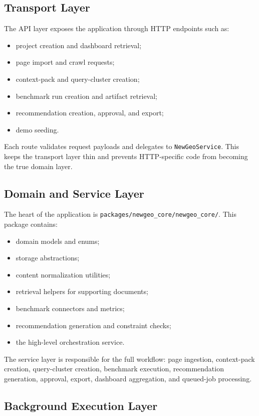 \subsection{Transport Layer}

The API layer exposes the application through HTTP endpoints such as:
\begin{itemize}
    \item project creation and dashboard retrieval;
    \item page import and crawl requests;
    \item context-pack and query-cluster creation;
    \item benchmark run creation and artifact retrieval;
    \item recommendation creation, approval, and export;
    \item demo seeding.
\end{itemize}

Each route validates request payloads and delegates to \texttt{NewGeoService}. This keeps the
transport layer thin and prevents HTTP-specific code from becoming the true domain layer.

\subsection{Domain and Service Layer}

The heart of the application is \texttt{packages/newgeo\_core/newgeo\_core/}. This package
contains:
\begin{itemize}
    \item domain models and enums;
    \item storage abstractions;
    \item content normalization utilities;
    \item retrieval helpers for supporting documents;
    \item benchmark connectors and metrics;
    \item recommendation generation and constraint checks;
    \item the high-level orchestration service.
\end{itemize}

The service layer is responsible for the full workflow: page ingestion, context-pack creation,
query-cluster creation, benchmark execution, recommendation generation, approval, export,
dashboard aggregation, and queued-job processing.

\subsection{Background Execution Layer}

